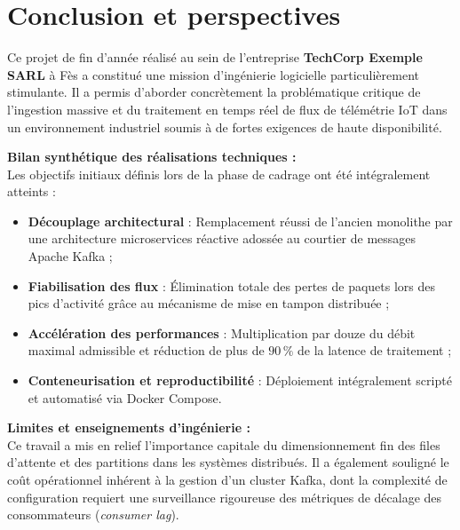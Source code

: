 \chapter*{Conclusion et perspectives}

\noindent
Ce projet de fin d'ann\'ee r\'ealis\'e au sein de l'entreprise \textbf{TechCorp Exemple SARL} \`a F\`es a constitu\'e une mission d'ing\'enierie logicielle particuli\`erement stimulante. Il a permis d'aborder concr\`etement la probl\'ematique critique de l'ingestion massive et du traitement en temps r\'eel de flux de t\'el\'em\'etrie IoT dans un environnement industriel soumis \`a de fortes exigences de haute disponibilit\'e.

\vspace{0.4cm}

\noindent
\textbf{Bilan synth\'etique des r\'ealisations techniques :}\\
Les objectifs initiaux d\'efinis lors de la phase de cadrage ont \'et\'e int\'egralement atteints :
\begin{itemize}
    \item \textbf{D\'ecouplage architectural} : Remplacement r\'eussi de l'ancien monolithe par une architecture microservices r\'eactive adoss\'ee au courtier de messages Apache Kafka ;
    \item \textbf{Fiabilisation des flux} : \'Elimination totale des pertes de paquets lors des pics d'activit\'e gr\^ace au m\'ecanisme de mise en tampon distribu\'ee ;
    \item \textbf{Acc\'el\'eration des performances} : Multiplication par douze du d\'ebit maximal admissible et r\'eduction de plus de $90\,\%$ de la latence de traitement ;
    \item \textbf{Conteneurisation et reproductibilit\'e} : D\'eploiement int\'egralement script\'e et automatis\'e via Docker Compose.
\end{itemize}

\vspace{0.4cm}

\noindent
\textbf{Limites et enseignements d'ing\'enierie :}\\
Ce travail a mis en relief l'importance capitale du dimensionnement fin des files d'attente et des partitions dans les syst\`emes distribu\'es. Il a \'egalement soulign\'e le co\^ut op\'erationnel inh\'erent \`a la gestion d'un cluster Kafka, dont la complexit\'e de configuration requiert une surveillance rigoureuse des m\'etriques de d\'ecalage des consommateurs (\textit{consumer lag}).

